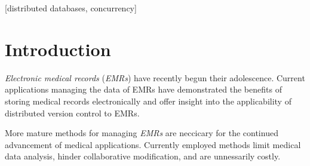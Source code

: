 \documentclass{acm_proc_article-sp}
\begin{document}


\maketitle
\begin{abstract}
This paper describes the applicability of \textit{distributed version control} to 
\textit{electronic medical records}. Demand for more efficient and effective methods
of managing \textit{electronic medical records} is growing.  
While \textit{distributed database systems} have been successfully utilized in leisure 
oriented applications they generally do not guarantee data integrity and in turn are 
not suited for \textit{electronic medical records}.  
\textit{Distributed version control} is designed for collaborative modification of electronic
data files while maintaingin data ingegrity and may server an efficient and effective method 
of managing \textit{electronic medical records}.
\end{abstract}

[distributed databases, concurrency]

\terms{}


\section{Introduction}
\textit{Electronic medical records} (\textit{EMRs}) have recently begun their adolescence.  
Current applications managing the data of EMRs have demonstrated the benefits
of storing medical records electronically and offer insight into the 
applicability of distributed version control to EMRs.

More mature methods for managing \textit{EMRs} are neccicary for the continued advancement of
medical applications.  Currently employed methods limit medical data analysis, hinder
collaborative modification, and are unnessarily costly.
\end{document}
